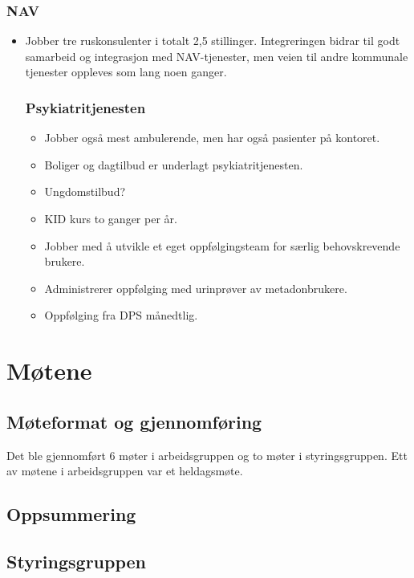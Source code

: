 \documentclass[11pt]{report} %
\begin{document}
      \subsection{NAV}\label{sec:org_nek_nav}
        \begin{itemize}
        \item Jobber tre ruskonsulenter i totalt 2,5 stillinger. Integreringen bidrar til godt samarbeid og integrasjon med NAV-tjenester, men veien til andre kommunale tjenester oppleves som lang noen ganger. 
      \subsection{Psykiatritjenesten}\label{sec:org_nek_psyk}  
            \begin{itemize} 
              \item Jobber også mest ambulerende, men har også pasienter på kontoret. 
              \item Boliger og dagtilbud er underlagt psykiatritjenesten.
              \item Ungdomstilbud?
              \item KID kurs to ganger per år.
              \item Jobber med å utvikle et eget oppfølgingsteam for særlig behovskrevende brukere. 
              \item Administrerer oppfølging med urinprøver av metadonbrukere. 
              \item Oppfølging fra DPS månedtlig.
            \end{itemize}
        \end{itemize}
        



\chapter{Møtene}\label{chap:m_main}
  \section{Møteformat og gjennomføring}\label{sec:m_form}
    Det ble gjennomført 6 møter i arbeidsgruppen og to møter i styringsgruppen. Ett av møtene i arbeidsgruppen var et heldagsmøte.
  \section{Oppsummering}\label{sec:m_sum}  
    
  \section{Styringsgruppen}\label{sec:m_stygr}
\end{document}
